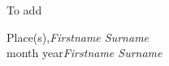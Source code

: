 %
%

\preface

To add
 

\vspace{\baselineskip}
\begin{flushright}\noindent
Place(s),\hfill {\it Firstname  Surname}\\
month year\hfill {\it Firstname  Surname}\\
\end{flushright}


